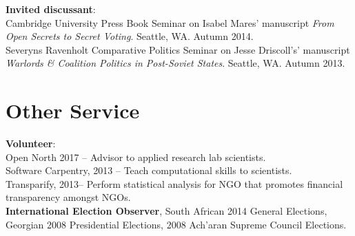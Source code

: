 \documentclass[margin,line]{res}
\begin{document}
{\begin{resume}
\textbf{Invited discussant}: \\
  Cambridge University Press Book Seminar on
Isabel Mares' manuscript \emph{From Open Secrets to Secret Voting}. Seattle, WA. Autumn 2014. \\
 Severyns Ravenholt Comparative Politics Seminar on
Jesse Driscoll's' manuscript \emph{Warlords \& Coalition Politics in
  Post-Soviet States}. Seattle, WA. Autumn 2013. \par\smallskip





\section{\sc  Other Service}
\textbf{Volunteer}: \\
Open North 2017 -- Advisor to applied research lab
scientists.\\
Software Carpentry, 2013 -- 
Teach computational skills to
scientists.\\
Transparify, 2013--
 Perform statistical analysis for NGO that promotes
financial transparency amongst NGOs.  \\
\textbf{International Election Observer}, South African 2014 General
Elections, Georgian 2008 Presidential Elections, 2008 Ach'aran Supreme
Council Elections. 


\end{resume}}
\end{document}
